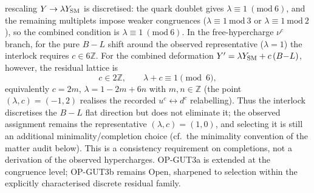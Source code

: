 rescaling $Y\to\lambda Y_{\rm SM}$ is discretised: the quark
doublet gives $\lambda\equiv1\ (\mathrm{mod}\ 6)$, and the
remaining multiplets impose weaker congruences
($\lambda\equiv1\ \mathrm{mod}\ 3$ or
$\lambda\equiv1\ \mathrm{mod}\ 2$), so the combined condition is
$\lambda\equiv1\ (\mathrm{mod}\ 6)$.
In the free-hypercharge $\nu^c$ branch, for the pure $B{-}L$
shift around the observed representative ($\lambda=1$) the
interlock requires $c\in6\mathbb Z$.
For the combined deformation
$Y'=\lambda Y_{\rm SM}+c\,(B{-}L)$, however, the residual
lattice is
\[
  c\in2\mathbb Z,\qquad \lambda+c\equiv1\pmod 6,
\]
equivalently $c=2m$, $\lambda=1-2m+6n$ with $m,n\in\mathbb Z$
(the point $(\lambda,c)=(-1,2)$ realises the recorded
$u^c\!\leftrightarrow\!d^c$ relabelling).
Thus the interlock discretises the $B{-}L$ flat direction but
does not eliminate it; the observed assignment remains the
representative $(\lambda,c)=(1,0)$, and selecting it is still an
additional minimality/completion choice
(cf.\ the minimality convention of the matter audit below).
This is a consistency requirement on completions, not a
derivation of the observed hypercharges.
OP-GUT3a is extended at the congruence level; OP-GUT3b remains
Open, sharpened to selection within the explicitly characterised
discrete residual family.


